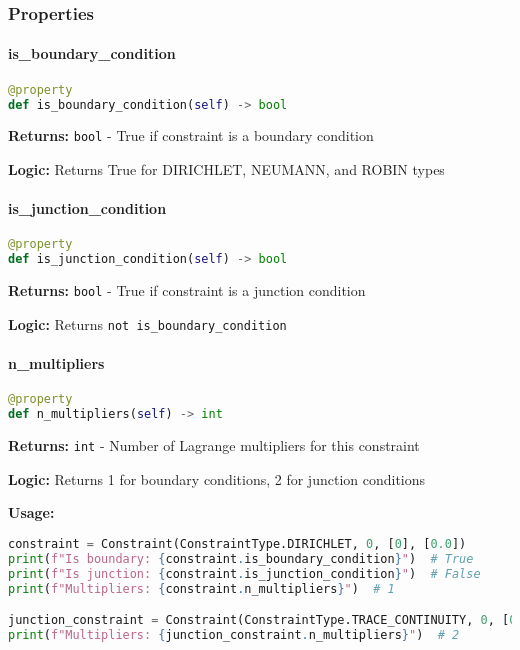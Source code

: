 \subsubsection{Properties}

\paragraph{is\_boundary\_condition}\leavevmode
\begin{lstlisting}[language=Python, caption=Boundary Condition Property]
@property
def is_boundary_condition(self) -> bool
\end{lstlisting}

\textbf{Returns:} \texttt{bool} - True if constraint is a boundary condition

\textbf{Logic:} Returns True for DIRICHLET, NEUMANN, and ROBIN types

\paragraph{is\_junction\_condition}\leavevmode
\begin{lstlisting}[language=Python, caption=Junction Condition Property]
@property
def is_junction_condition(self) -> bool
\end{lstlisting}

\textbf{Returns:} \texttt{bool} - True if constraint is a junction condition

\textbf{Logic:} Returns \texttt{not is\_boundary\_condition}

\paragraph{n\_multipliers}\leavevmode
\begin{lstlisting}[language=Python, caption=Number of Multipliers Property]
@property
def n_multipliers(self) -> int
\end{lstlisting}

\textbf{Returns:} \texttt{int} - Number of Lagrange multipliers for this constraint

\textbf{Logic:} Returns 1 for boundary conditions, 2 for junction conditions

\textbf{Usage:}
\begin{lstlisting}[language=Python, caption=Properties Usage]
constraint = Constraint(ConstraintType.DIRICHLET, 0, [0], [0.0])
print(f"Is boundary: {constraint.is_boundary_condition}")  # True
print(f"Is junction: {constraint.is_junction_condition}")  # False
print(f"Multipliers: {constraint.n_multipliers}")  # 1

junction_constraint = Constraint(ConstraintType.TRACE_CONTINUITY, 0, [0, 1], [1.0, 1.0])
print(f"Multipliers: {junction_constraint.n_multipliers}")  # 2
\end{lstlisting}

